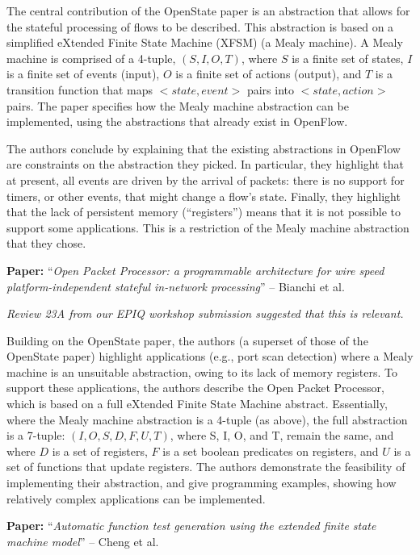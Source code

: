 \documentclass[10pt,a4paper]{article}
\newcommand{\paper}[3]{\vspace{4mm}\noindent\textbf{Paper:} ``\textit{#1}'' -- #2 \cite{#3}\vspace{3mm}}
\begin{document}
The central contribution of the OpenState paper is an abstraction
that allows for the stateful processing of flows to be described. This abstraction is
based on a simplified eXtended Finite State Machine (XFSM) (a Mealy machine). A Mealy
machine is comprised of a 4-tuple, $(S, I, O, T)$, where $S$ is a finite set of states,
$I$ is a finite set of events (input), $O$ is a finite set of actions (output), and
$T$ is a transition function that maps $<state, event>$ pairs into $<state, action>$
pairs. The paper specifies how the Mealy machine abstraction can be implemented, using the
abstractions that already exist in OpenFlow. 

The authors conclude by explaining that the existing abstractions in OpenFlow are
constraints on the abstraction they picked. In particular, they highlight that at present,
all events are driven by the arrival of packets: there is no support for timers, or other
events, that might change a flow's state. Finally, they highlight that the lack of
persistent memory (``registers'') means that it is not possible to support some 
applications. This is a restriction of the Mealy machine abstraction that they chose. 

\paper{Open Packet Processor: a programmable architecture for wire speed platform-independent
       stateful in-network processing}{Bianchi et al.}{bianchi:2016:open-packet}

\emph{Review 23A from our EPIQ workshop submission suggested that this is relevant.}

Building on the OpenState paper, the authors (a superset of those of the OpenState paper)
highlight applications (e.g., port scan detection) where a Mealy machine is an unsuitable
abstraction, owing to its lack of memory registers. To support these applications, the
authors describe the Open Packet Processor, which is based on a full eXtended Finite State
Machine abstract. Essentially, where the Mealy machine abstraction is a 4-tuple (as
above), the full abstraction is a 7-tuple: $(I, O, S, D, F, U, T)$, where S, I, O, and T,
remain the same, and where $D$ is a set of registers, $F$ is a set boolean predicates on
registers, and $U$ is a set of functions that update registers. The authors demonstrate
the feasibility of implementing their abstraction, and give programming examples, showing
how relatively complex applications can be implemented.

\paper{Automatic function test generation using the extended finite state machine model}
      {Cheng et al.}{cheng1993automatic}
\end{document}
